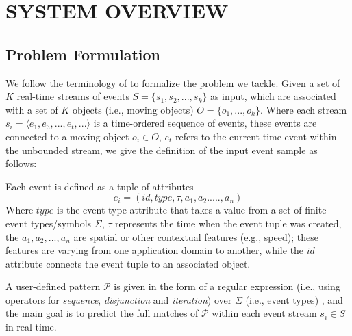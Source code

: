 \section{SYSTEM OVERVIEW}
\label{sec:system}
\subsection{Problem Formulation}

We follow the terminology of \cite{luckham2008power,alevizos2015complex,zhou2015pattern} to formalize the problem we tackle. Given a set of \emph{$K$} real-time streams of events $S = \{ s_1,s_2, ..., s_k\}$ as input, which are associated with a set of \emph{$K$}  objects (i.e., moving objects) $O = \{ o_1, ..., o_k\}$. Where each stream $s_i=\langle e_1,e_3,...,e_t,...\rangle$  is a time-ordered sequence of events, these events are connected to a moving object  $o_i \in O$,  $e_t$  refers to the current time event within the unbounded stream, we give the definition of the input event sample as follows:  
\begin{definition}
	Each event is defined as a tuple of attributes $$e_i = (id,type,\tau,a_1,a_2.....,a_n)$$ Where $type$ is the event type attribute that takes a value from a set of finite event types/symbols $\Sigma$, $\tau$ represents the time when the event tuple was created,  the  $a_1,a_2,...,a_n$ are spatial or other contextual features (e.g., speed); these features are varying from one application domain to another, while the $id$ attribute connects the event tuple to an associated object.
\end{definition}

\par A user-defined pattern $\mathcal{P}$ is given in the form of a regular expression (i.e., using operators for \textit{sequence}, \textit{disjunction} and \textit{iteration}) over $\Sigma$ (i.e., event types) \cite{alevizos2017event}, and the main goal is to predict the full matches of $\mathcal{P}$ within each event stream $s_i\in S$ in real-time.

